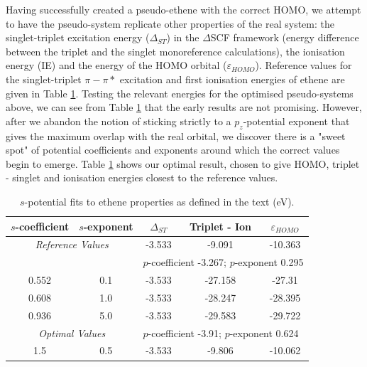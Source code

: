 \documentclass[journal=jctcce,manuscript=article]{achemso}
\begin{document}
Having successfully created a pseudo-ethene with the correct HOMO, we attempt to have the pseudo-system replicate other properties of the real system:
the singlet-triplet excitation energy ($\Delta_{ST}$) in the $\Delta$SCF framework (energy difference between the triplet and the singlet monoreference
calculations), the ionisation energy (IE) and the energy of the HOMO orbital ($\varepsilon_{HOMO}$). Reference values for the singlet-triplet \(\pi-\pi*\) excitation and first ionisation energies of ethene are given in Table \ref{table:ethene_excitations}. Testing the relevant energies for the optimised pseudo-systems above, we can see from Table \ref{table:ethene_excitations} that the early results are not promising. However, after we abandon the notion of sticking strictly to a \(p_{z}\)-potential exponent that gives the maximum overlap with the real orbital, we discover there is a "sweet spot" of potential coefficients and exponents around which the correct values begin to emerge. Table \ref{table:ethene_excitations} shows our optimal result, chosen to give HOMO, triplet - singlet and ionisation energies closest to the reference values. 

\begin{table}[ht]
\caption{\(s\)-potential fits to ethene properties as defined in the text (eV).}
\begin{tabular}{c c c c c}
\hline
\(s\)-coefficient & \(s\)-exponent & $\Delta_{ST}$  & Triplet - Ion  & $\varepsilon_{HOMO}$  \\
\hline
\multicolumn{2}{c}{\textit{Reference Values}} & -3.533 & -9.091 & -10.363 \\
\hline
&& \multicolumn{3}{l}{\(p\)-coefficient -3.267; \(p\)-exponent 0.295} \\
\hline
0.552 & 0.1 & -3.533 & -27.158 & -27.31 \\
0.608 & 1.0 & -3.533 & -28.247 & -28.395 \\
0.936 & 5.0 & -3.533 & -29.583 & -29.722 \\
\hline
\multicolumn{2}{c}{\textit{Optimal Values}} &\multicolumn{3}{l}{\(p\)-coefficient -3.91; \(p\)-exponent 0.624} \\
\hline
1.5 & 0.5 & -3.533 & -9.806 & -10.062 \\
\hline
\end{tabular}
\label{table:ethene_excitations}
\end{table}
\end{document}
